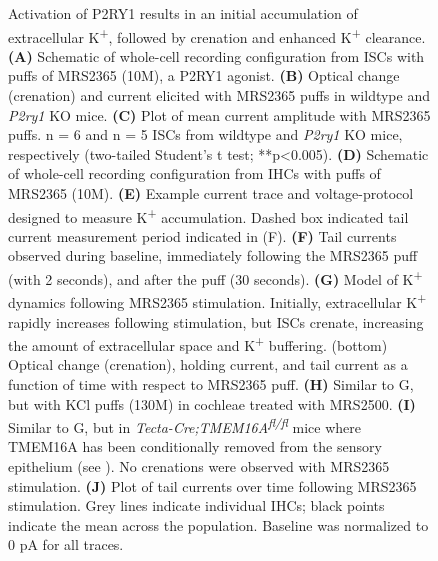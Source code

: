 \documentclass[9pt,lineno]{elife}
\begin{document}
\addtocounter{figure}{-1}
\begin{figure} [t!]
\begin{fullwidth}
  \caption{Activation of P2RY1 results in an initial accumulation of extracellular K\textsuperscript{+}, followed by crenation and enhanced K\textsuperscript{+} clearance.
\textbf{(A)} Schematic of whole-cell recording configuration from ISCs with puffs of MRS2365 (10\textmu M), a P2RY1 agonist.
\textbf{(B)} Optical change (crenation) and current elicited with MRS2365 puffs in wildtype and \textit{P2ry1} KO mice.
\textbf{(C)} Plot of mean current amplitude with MRS2365 puffs. n = 6 and n = 5 ISCs from wildtype and \textit{P2ry1} KO mice, respectively (two-tailed Student’s t test; **p<0.005).
\textbf{(D)} Schematic of whole-cell recording configuration from IHCs with puffs of MRS2365 (10\textmu M).
\textbf{(E)} Example current trace and voltage-protocol designed to measure K\textsuperscript{+} accumulation. Dashed box indicated tail current measurement period indicated in (F).
\textbf{(F)} Tail currents observed during baseline, immediately following the MRS2365 puff (with 2 seconds), and after the puff (30 seconds).
\textbf{(G)} Model of K\textsuperscript{+} dynamics following MRS2365 stimulation. Initially, extracellular K\textsuperscript{+} rapidly increases following stimulation, but ISCs crenate, increasing the amount of extracellular space and K\textsuperscript{+} buffering. (bottom) Optical change (crenation), holding current, and tail current as a function of time with respect to MRS2365 puff.
\textbf{(H)} Similar to G, but with KCl puffs (130\textmu M) in cochleae treated with MRS2500.
\textbf{(I)} Similar to G, but in \textit{Tecta-Cre;TMEM16A\textsuperscript{fl/fl}} mice where TMEM16A has been conditionally removed from the sensory epithelium (see ). No crenations were observed with MRS2365 stimulation.
\textbf{(J)} Plot of tail currents over time following MRS2365 stimulation. Grey lines indicate individual IHCs; black points indicate the mean across the population. Baseline was normalized to 0 pA for all traces. 
}
\end{fullwidth}
\end{figure}
\end{document}
